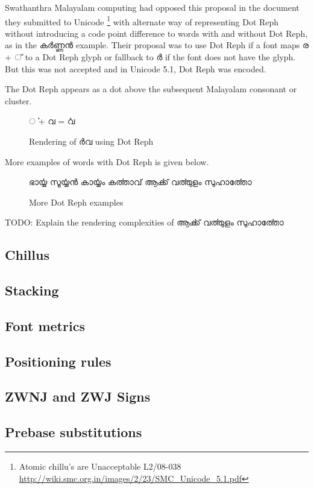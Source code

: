 Swathanthra Malayalam computing had opposed this proposal in the document they
submitted to Unicode \footnote{Atomic chillu's are Unacceptable L2/08-038 \url{http://wiki.smc.org.in/images/2/23/SMC_Unicode_5.1.pdf}}
with alternate way of representing Dot Reph without introducing a code point
difference to words with and without Dot Reph, as in the {\malayalam കര്‍ണ്ണന്‍}
example. Their proposal was to use Dot Reph if a font maps {\malayalam ര + ്  }
to a Dot Reph glyph or fallback to {\malayalam ര്‍} if the font does not have
the glyph. But this was not accepted and in Unicode 5.1, Dot Reph was encoded.

The Dot Reph appears as a dot above the subsequent Malayalam consonant or cluster.

\begin{figure}[h!]
  \centering
  {\meera\textexample ൎ + വ  = ൎവ }\\
  \caption{Rendering of {\malayalam ര്‍വ } using Dot Reph }
\end{figure}

More examples of words with Dot Reph is given below.

\begin{figure}[h!]
  \centering
  {\meera ഭാൎയ്യ സൂൎയ്യന്‍ കാൎയ്യം  കൎത്താവ്  ആൎക്ക്  വൎത്തുളം  സുഹാൎത്തോ}\\
  \caption{More Dot Reph examples}
\end{figure}

TODO: Explain the rendering complexities of {\meera ആൎക്ക്  വൎത്തുളം  സുഹാൎത്തോ}

\subsection {Chillus}
\subsection {Stacking}
\subsection {Font metrics}
\subsection {Positioning rules}
\subsection {ZWNJ and ZWJ Signs}
\subsection {Prebase substitutions}
